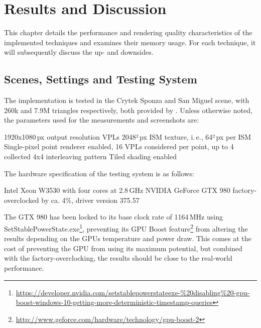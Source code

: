 

\chapter{Results and Discussion}
\label{chap:results}

This chapter details the performance and rendering quality characteristics of the implemented techniques and examines their memory usage. For each technique, it will subsequently discuss the up- and downsides.

\section{Scenes, Settings and Testing System}
\label{sec:results:settings}

The implementation is tested in the Crytek Sponza and San Miguel scene, with 260k and 7.9M triangles respectively, both provided by \citet{McGuire2011Data}. Unless otherwise noted, the parameters used for the measurements and screenshots are:

\begin{outline}
    \1 1920x1080\,px output resolution
     VPLs
    \1 2048²\,px ISM texture, i.\,e., 64²\,px per ISM
    \1 Single-pixel point renderer enabled, 16 VPLs considered per point, up to 4 collected
    \1 4x4 interleaving pattern
    \1 Tiled shading enabled
\end{outline}

\noindent
The hardware specification of the testing system is as follows:

\begin{outline}
    \1 Intel Xeon W3530 with four cores at 2.8\,GHz
    \1 NVIDIA GeForce GTX 980 factory-overclocked by ca. 4\%, driver version 375.57
\end{outline}

The GTX 980 has been locked to its base clock rate of 1164\,MHz using SetStablePowerState.exe\footnote{\url{https://developer.nvidia.com/setstablepowerstateexe-\%20disabling\%20-gpu-boost-windows-10-getting-more-deterministic-timestamp-queries}}, preventing its GPU Boost feature\footnote{\url{http://www.geforce.com/hardware/technology/gpu-boost-2}} from altering the results depending on the GPUs temperature and power draw. This comes at the cost of preventing the GPU from using its maximum potential, but combined with the factory-overclocking, the results should be close to the real-world performance.

